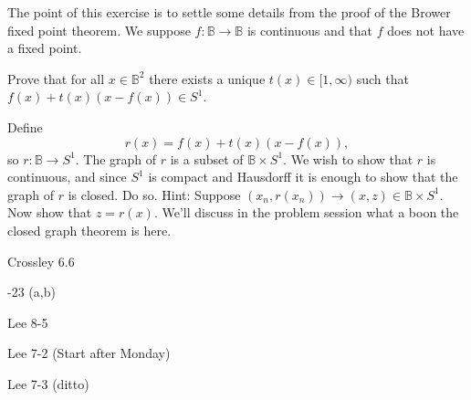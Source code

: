 \documentclass{homework651}
\newcommand{\bbB}{\mathbb{B}}
\begin{document}
\begin{problems}

\problem The point of this exercise is to settle some details from the 
proof of the Brower fixed point theorem.  We suppose $f:\bbB\to \bbB$ is
continuous and that $f$ does not have a fixed point.
\begin{subproblems}
\item Prove that for all $x\in \bbB^2$ there exists a unique
$t(x)\in[1,\infty)$ such that $f(x)+t(x)(x-f(x))\in S^1$.
\item Define
\[
r(x) = f(x)+t(x)(x-f(x)),
\]
so $r:\bbB\to S^1$.  The graph of $r$ is a subset of $\bbB\times S^1$.  
We wish to show that $r$ is continuous, and since $S^1$ is compact and Hausdorff
it is enough to show that the graph of $r$ is closed.  Do so.  Hint:
Suppose $(x_n,r(x_n))\to (x,z)\in \bbB\times S^1$.  Now show that $z=r(x)$.
We'll discuss in the problem session what a boon the closed graph theorem is here.
\end{subproblems}

\problem Crossley 6.6

-23 (a,b)

\problem Lee 8-5

\problem Lee 7-2 (Start after Monday)

\problem Lee 7-3 (ditto)

\end{problems}
\end{document}
